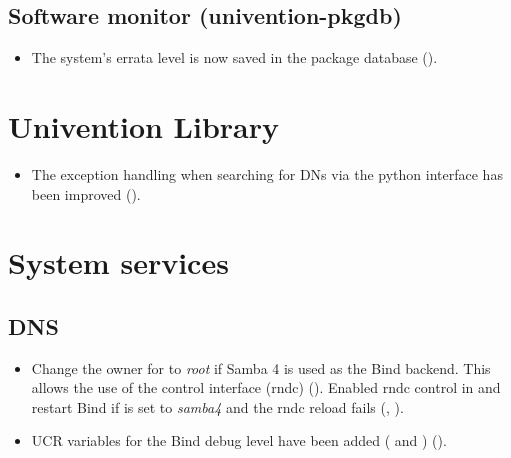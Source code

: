 \subsection{Software monitor (univention-pkgdb)}
\begin{itemize}
\item The system's errata level is now saved in the package database
  ().
\end{itemize}

\section{Univention Library}
\begin{itemize}
\item The exception handling when searching for DNs via the python
  interface has been improved ().
\end{itemize}


\section{System services}


\subsection{DNS}
\begin{itemize}

\item Change the owner for  to \emph{root} if Samba 4
is used as the Bind backend. This allows the use of the control interface
(rndc) (). Enabled rndc control in  and restart Bind if
 is set to \emph{samba4} and the rndc reload fails (,
).

\item UCR variables for the Bind debug level have been added
( and )
().

\end{itemize}


